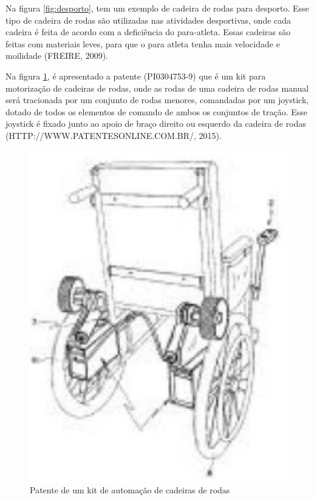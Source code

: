 Na figura \ref{fig:desporto}, tem um exemplo de cadeira de rodas para desporto. Esse tipo de cadeira de rodas são utilizadas nas atividades desportivas, onde cada cadeira é feita de acordo com a deficiência do para-atleta. Essas cadeiras são feitas com materiais leves, para que o para atleta tenha mais velocidade e moilidade (FREIRE, 2009).

Na figura \ref{fig:kit_motorizacao}, é apresentado a patente (PI0304753-9) que é um kit para motorização de cadeiras de rodas, onde as rodas de uma cadeira de rodas manual será tracionada por um conjunto de rodas menores, comandadas por um joystick, dotado de todos os elementos de comando de ambos os conjuntos de tração. Esse joystick é fixado junto ao apoio de braço direito ou esquerdo da cadeira de rodas (HTTP://WWW.PATENTESONLINE.COM.BR/,
2015).

\begin{figure}[!htb]
  \centering
  \includegraphics[keepaspectratio=true,scale=0.50]{figuras/introducao/kit_motorizacao}
  \caption{Patente de um kit de automação de cadeiras de rodas}
  \label{fig:kit_motorizacao}
\end{figure}

